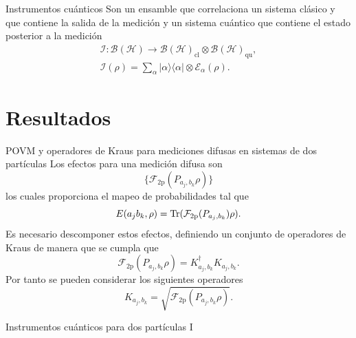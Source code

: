 \documentclass[svgnames,12pt,aspectratio=149]{beamer}
\newcommand{\rala}{\rangle\langle}
\newcommand{\tr}{{\rm Tr}}
\newcommand{\E}{\mathcal{E}}
\begin{document}
\begin{frame}{Instrumentos cuánticos}
  Son un ensamble que correlaciona un sistema clásico y que contiene la salida de la medición y un sistema cuántico que contiene el estado posterior a la medición \begin{equation*}
    \begin{split}
        \mathcal{I}: \mathcal{B(H)}\rightarrow\mathcal{B(H)}_{\text{cl}}\otimes \mathcal{B(H)}_{\text{qu}},\\
    \mathcal{I}(\rho)=\sum_\alpha |\alpha\rala\alpha|\otimes \E_\alpha(\rho).
    \end{split}
\end{equation*}
\end{frame}


\section{Resultados}
\begin{frame}{POVM y operadores de Kraus para mediciones difusas en sistemas de dos partículas}
  Los efectos para una medición difusa son \[\{\mathcal{F}_{2\text{p}}(P_{a_j,b_k}\rho)\}\]los cuales proporciona el mapeo de probabilidades tal que \[   E(a_j b_k, \rho)= \tr(\mathcal{F}_{2\text{p}}({P_{a_j,b_k}})\rho).\] Es necesario descomponer estos efectos, definiendo un conjunto de operadores de Kraus de manera que se cumpla que \[\mathcal{F}_{2\text{p}}(P_{a_j,b_k}\rho)=K_{a_j,b_k}^\dagger K_{a_j,b_k}.\] Por tanto se pueden considerar los siguientes operadores \[K_{a_j,b_k}=\sqrt{\mathcal{F}_{2\text{p}}(P_{a_j,b_k}\rho)}.\]
\end{frame}

\begin{frame}{Instrumentos cuánticos para dos partículas I}

\begin{figure}[H]
\centering
{}
\caption*{}
\end{figure} 




\end{frame}
\end{document}
